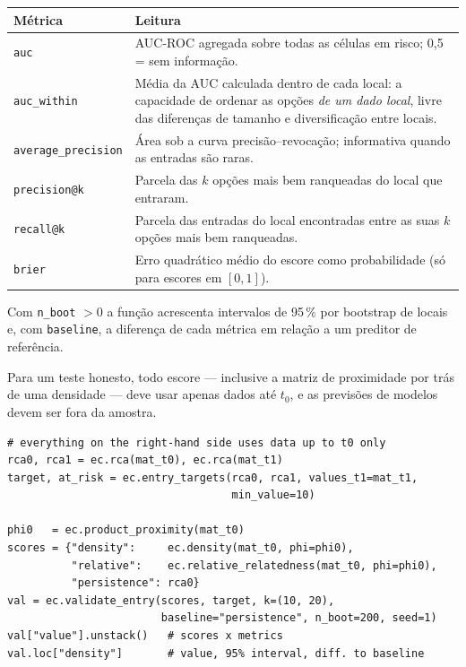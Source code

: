 \documentclass[12pt, a4paper]{article}
\begin{document}
\begin{center}
\renewcommand{\arraystretch}{1.25}
\small
\begin{tabular}{l>{\raggedright\arraybackslash}p{10.5cm}}
\toprule
\textbf{M\'{e}trica} & \textbf{Leitura} \\
\midrule
\texttt{auc} & AUC-ROC agregada sobre todas as c\'{e}lulas em risco;
  0,5 = sem informa\c{c}\~{a}o. \\
\texttt{auc\_within} & M\'{e}dia da AUC calculada dentro de cada local: a
  capacidade de ordenar as op\c{c}\~{o}es \emph{de um dado local}, livre
  das diferen\c{c}as de tamanho e diversifica\c{c}\~{a}o entre locais. \\
\texttt{average\_precision} & \'{A}rea sob a curva precis\~{a}o--revoca\c{c}\~{a}o;
  informativa quando as entradas s\~{a}o raras. \\
\texttt{precision@k} & Parcela das $k$ op\c{c}\~{o}es mais bem ranqueadas
  do local que entraram. \\
\texttt{recall@k} & Parcela das entradas do local encontradas entre as
  suas $k$ op\c{c}\~{o}es mais bem ranqueadas. \\
\texttt{brier} & Erro quadr\'{a}tico m\'{e}dio do escore como probabilidade
  (s\'{o} para escores em $[0,1]$). \\
\bottomrule
\end{tabular}
\end{center}

Com \texttt{n\_boot} $> 0$ a fun\c{c}\~{a}o acrescenta intervalos de
95\,\% por bootstrap de locais e, com \texttt{baseline}, a diferen\c{c}a
de cada m\'{e}trica em rela\c{c}\~{a}o a um preditor de refer\^{e}ncia.

\begin{warnbox}
  Para um teste honesto, todo escore --- inclusive a matriz de
  proximidade por tr\'{a}s de uma densidade --- deve usar apenas dados
  at\'{e} $t_0$, e as previs\~{o}es de modelos devem ser fora da amostra.
\end{warnbox}

\begin{lstlisting}[caption={Os escores preveem a entrada?}]
# everything on the right-hand side uses data up to t0 only
rca0, rca1 = ec.rca(mat_t0), ec.rca(mat_t1)
target, at_risk = ec.entry_targets(rca0, rca1, values_t1=mat_t1,
                                   min_value=10)

phi0   = ec.product_proximity(mat_t0)
scores = {"density":     ec.density(mat_t0, phi=phi0),
          "relative":    ec.relative_relatedness(mat_t0, phi=phi0),
          "persistence": rca0}
val = ec.validate_entry(scores, target, k=(10, 20),
                        baseline="persistence", n_boot=200, seed=1)
val["value"].unstack()   # scores x metrics
val.loc["density"]       # value, 95% interval, diff. to baseline
\end{lstlisting}
\end{document}
